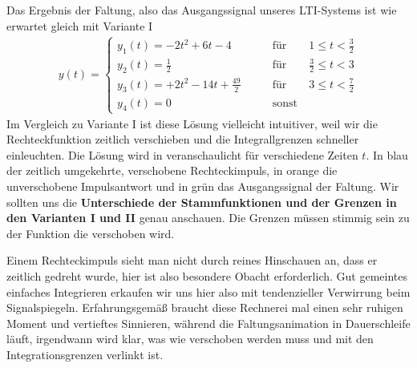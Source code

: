 \begin{Loesung}
Das Ergebnis der Faltung, also das Ausgangssignal unseres LTI-Systems ist
wie erwartet gleich mit Variante I
\begin{align}
y(t) =
\begin{cases}
  y_1(t) = -2 t^2 + 6 t - 4 &\qquad \mathrm{für} \qquad 1 \leq t < \frac{3}{2}\\
  y_2(t) = \frac{1}{2}  &\qquad \mathrm{für} \qquad \frac{3}{2} \leq t < 3\\
  y_3(t) = +2 t^2 - 14 t + \frac{49}{2} &\qquad \mathrm{für} \qquad 3 \leq t < \frac{7}{2}\\
  y_4(t)=0 &\qquad \mathrm{sonst}
\end{cases}
\end{align}
Im Vergleich zu Variante I ist diese Lösung vielleicht
intuitiver, weil wir die Rechteckfunktion zeitlich verschieben und die
Integrallgrenzen schneller einleuchten.
%
Die Lösung wird in  veranschaulicht für verschiedene
Zeiten $t$. In blau der zeitlich umgekehrte, verschobene Rechteckimpuls, in
orange die unverschobene Impulsantwort und in grün das Ausgangssignal der Faltung.
%
Wir sollten uns die \textbf{Unterschiede der Stammfunktionen und der Grenzen in den
Varianten I und II} genau anschauen.
Die Grenzen müssen stimmig sein zu der Funktion die verschoben wird.
%

Einem Rechteckimpuls sieht man nicht durch reines Hinschauen an, dass er
zeitlich gedreht wurde, hier ist also besondere Obacht erforderlich.
%
Gut gemeintes einfaches Integrieren erkaufen wir uns hier also mit tendenzieller
Verwirrung beim Signalspiegeln.
%
Erfahrungsgemäß braucht diese Rechnerei mal einen sehr ruhigen Moment und vertieftes
Sinnieren, während die Faltungsanimation in Dauerschleife läuft, irgendwann
wird klar, was wie verschoben werden muss und mit den Integrationsgrenzen verlinkt
ist.
%
\end{Loesung}















